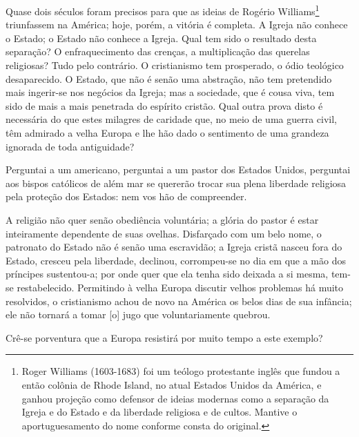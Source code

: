 Quase dois séculos foram precisos para que as ideias de Rogério
Williams\footnote{Roger Williams (1603-1683) foi um teólogo
  protestante inglês que fundou a então colônia de Rhode Island, no
  atual Estados Unidos da América, e ganhou projeção como defensor de
  ideias modernas como a separação da Igreja e do Estado e da liberdade
  religiosa e de cultos. Mantive o aportuguesamento do nome conforme
  consta do original.} triunfassem na América; hoje, porém, a vitória é
completa. A Igreja não conhece o Estado; o Estado não conhece a Igreja.
Qual tem sido o resultado desta separação? O enfraquecimento das
crenças, a multiplicação das querelas religiosas? Tudo pelo contrário. O
cristianismo tem prosperado, o ódio teológico desaparecido. O Estado,
que não é senão uma abstração, não tem pretendido mais ingerir-se nos
negócios da Igreja; mas a sociedade, que é cousa viva, tem sido de mais
a mais penetrada do espírito cristão. Qual outra prova disto é
necessária do que estes milagres de caridade que, no meio de uma guerra
civil, têm admirado a velha Europa e lhe hão dado o sentimento de uma
grandeza ignorada de toda antiguidade?

Perguntai a um americano, perguntai a um pastor dos Estados Unidos,
perguntai aos bispos católicos de além mar se quererão trocar sua plena
liberdade religiosa pela proteção dos Estados: nem vos hão de
compreender.

A religião não quer senão obediência voluntária; a glória do pastor é
estar inteiramente dependente de suas ovelhas. Disfarçado com um belo
nome, o patronato do Estado não é senão uma escravidão; a Igreja cristã
nasceu fora do Estado, cresceu pela liberdade, declinou, corrompeu-se no
dia em que a mão dos príncipes sustentou-a; por onde quer que ela tenha
sido deixada a si mesma, tem-se restabelecido. Permitindo à velha Europa
discutir velhos problemas há muito resolvidos, o cristianismo achou de
novo na América os belos dias de sua infância; ele não tornará a tomar
{[}o{]} jugo que voluntariamente quebrou.

Crê-se porventura que a Europa resistirá por muito tempo a este exemplo?

